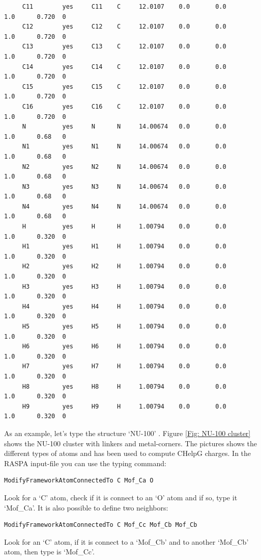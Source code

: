 \begin{small}
\begin{verbatim}
     C11        yes     C11    C     12.0107    0.0       0.0          1.0      0.720  0
     C12        yes     C12    C     12.0107    0.0       0.0          1.0      0.720  0
     C13        yes     C13    C     12.0107    0.0       0.0          1.0      0.720  0
     C14        yes     C14    C     12.0107    0.0       0.0          1.0      0.720  0
     C15        yes     C15    C     12.0107    0.0       0.0          1.0      0.720  0
     C16        yes     C16    C     12.0107    0.0       0.0          1.0      0.720  0
     N          yes     N      N     14.00674   0.0       0.0          1.0      0.68   0
     N1         yes     N1     N     14.00674   0.0       0.0          1.0      0.68   0
     N2         yes     N2     N     14.00674   0.0       0.0          1.0      0.68   0
     N3         yes     N3     N     14.00674   0.0       0.0          1.0      0.68   0
     N4         yes     N4     N     14.00674   0.0       0.0          1.0      0.68   0
     H          yes     H      H     1.00794    0.0       0.0          1.0      0.320  0
     H1         yes     H1     H     1.00794    0.0       0.0          1.0      0.320  0
     H2         yes     H2     H     1.00794    0.0       0.0          1.0      0.320  0
     H3         yes     H3     H     1.00794    0.0       0.0          1.0      0.320  0
     H4         yes     H4     H     1.00794    0.0       0.0          1.0      0.320  0
     H5         yes     H5     H     1.00794    0.0       0.0          1.0      0.320  0
     H6         yes     H6     H     1.00794    0.0       0.0          1.0      0.320  0
     H7         yes     H7     H     1.00794    0.0       0.0          1.0      0.320  0
     H8         yes     H8     H     1.00794    0.0       0.0          1.0      0.320  0
     H9         yes     H9     H     1.00794    0.0       0.0          1.0      0.320  0
\end{verbatim}
\end{small}

As an example, let's type the structure `NU-100' \cite{Farha2010}. Figure \ref{Fig: NU-100 cluster} shows the NU-100 cluster with linkers and
metal-corners. The pictures shows the different types of atoms and has been used to compute CHelpG charges.
In the RASPA input-file you can use the typing command:
\begin{verbatim}
ModifyFrameworkAtomConnectedTo C Mof_Ca O
\end{verbatim}
Look for a `C' atom, check if it is connect to an `O' atom and if so, type it `Mof\_Ca'.
It is also possible to define two neighbors:
\begin{verbatim}
ModifyFrameworkAtomConnectedTo C Mof_Cc Mof_Cb Mof_Cb
\end{verbatim}
Look for an `C' atom, if it is connect to a `Mof\_Cb' and to another `Mof\_Cb' atom, then type is `Mof\_Cc'.

